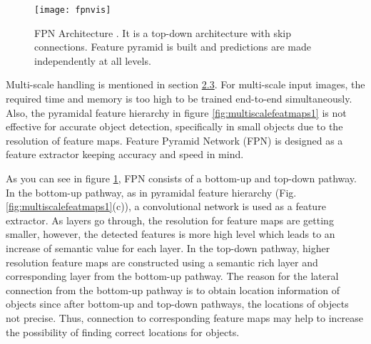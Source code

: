 \documentclass{article}
\begin{document}
\setlength{\parindent}{6ex}

\begin{figure}
    \centering
    \texttt{[image: fpnvis]}
    \caption{FPN Architecture \cite{fpncite}. It is a top-down 
    architecture with skip connections. Feature pyramid is 
    built and predictions are made independently at all levels.}
    \label{fig:fpnvis1}
\end{figure}

\indent

Multi-scale handling is mentioned in section \hyperref[sec:multscale]{2.3}. For multi-scale input images, 
the required time and memory is too high to be trained end-to-end simultaneously. 
Also, the pyramidal feature hierarchy in figure \ref{fig:multiscalefeatmaps1} is not 
effective for accurate object detection, specifically in small objects due to the 
resolution of feature maps. Feature Pyramid Network (FPN) \cite{fpncite} is designed as a 
feature extractor keeping accuracy and speed in mind. \par 

As you can see in figure \ref{fig:fpnvis1}, FPN consists of a bottom-up and 
top-down pathway. In the bottom-up pathway, as in pyramidal feature hierarchy 
(Fig. \ref{fig:multiscalefeatmaps1}(c)), a convolutional network is used as 
a feature extractor. As layers go through, the resolution for feature maps 
are getting smaller, however, the detected features is more high level which 
leads to an increase of semantic value for each layer. In the top-down pathway, 
higher resolution feature maps are constructed using a semantic rich layer and 
corresponding layer from the bottom-up pathway. The reason for the lateral 
connection from the bottom-up pathway is to obtain location information of 
objects since after bottom-up and top-down pathways, the locations of 
objects not precise. Thus, connection to corresponding feature maps 
may help to increase the possibility of finding correct locations for 
objects. 
\end{document}
